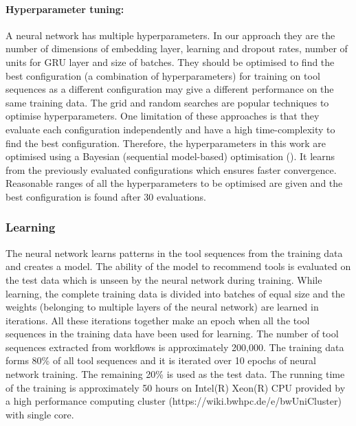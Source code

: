 \documentclass{bioinfo}
\begin{document}
\paragraph*{Hyperparameter tuning:}
A neural network has multiple hyperparameters. In our approach they are the number of dimensions of embedding layer, learning and dropout rates, number of units for GRU layer and size of batches. They should be optimised to find the best configuration (a combination of hyperparameters) for training on tool sequences as a different configuration may give a different performance on the same training data. The grid and random searches are popular techniques to optimise hyperparameters. One limitation of these approaches is that they evaluate each configuration independently and have a high time-complexity to find the best configuration. Therefore, the hyperparameters in this work are optimised using a Bayesian (sequential model-based) optimisation (\cite{Bergstra2013}). It learns from the previously evaluated configurations which ensures faster convergence. Reasonable ranges of all the hyperparameters to be optimised are given and the best configuration is found after 30 evaluations.

\subsubsection{Learning}
The neural network learns patterns in the tool sequences from the training data and creates a model. The ability of the model to recommend tools is evaluated on the test data which is unseen by the neural network during training. While learning, the complete training data is divided into batches of equal size and the weights (belonging to multiple layers of the neural network) are learned in iterations. All these iterations together make an epoch when all the tool sequences in the training data have been used for learning. The number of tool sequences extracted from workflows is approximately 200,000. The training data forms 80\% of all tool sequences and it is iterated over 10 epochs of neural network training. The remaining 20\% is used as the test data. The running time of the training is approximately 50 hours on Intel(R) Xeon(R) CPU provided by a high performance computing cluster (https://wiki.bwhpc.de/e/bwUniCluster) with single core.
\end{document}
